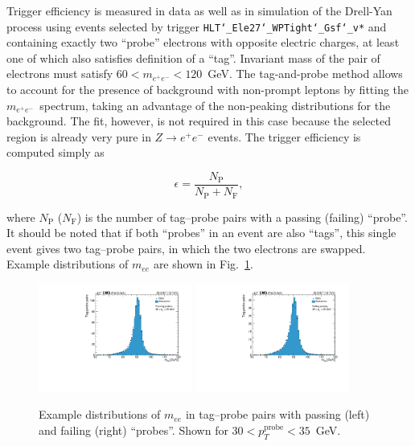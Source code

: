 Trigger efficiency is measured in data as well as in simulation of the Drell-Yan process using events selected by trigger \texttt{HLT\char`_Ele27\char`_WPTight\char`_Gsf\char`_v*} and containing exactly two ``probe'' electrons with opposite electric charges, at least one of which also satisfies definition of a ``tag''.
Invariant mass of the pair of electrons must satisfy $60 < m_{e^+e^-} < 120$~GeV.
The tag-and-probe method allows to account for the presence of background with non-prompt leptons by fitting the $m_{e^+e^-}$~spectrum, taking an advantage of the non-peaking distributions for the background.
The fit, however, is not required in this case because the selected region is already very pure in $Z \rightarrow e^+e^-$ events.
The trigger efficiency is computed simply as
\begin{linenomath}
\begin{equation}
 \epsilon = \frac{N_\text{P}}{N_\text{P} + N_\text{F}},
\end{equation}
\end{linenomath}
where $N_\text{P}$ ($N_\text{F}$) is the number of tag--probe pairs with a passing (failing) ``probe''.
It should be noted that if both ``probes'' in an event are also ``tags'', this single event gives two tag--probe pairs, in which the two electrons are swapped.
Example distributions of $m_{ee}$ are shown in Fig.~\ref{Fig:TnPExamples}.
\begin{figure}
  \centering
  \includegraphics[width=0.45\textwidth]{fig/chapt7/trigger_eff/pass_pt30to35.pdf}
  \includegraphics[width=0.45\textwidth]{fig/chapt7/trigger_eff/fail_pt30to35.pdf}
  \caption{Example distributions of $m_{ee}$ in tag--probe pairs with passing (left) and failing (right) ``probes''. Shown for $30 < p_{T}^\text{probe} < 35$~GeV.}
  \label{Fig:TnPExamples}
\end{figure}
